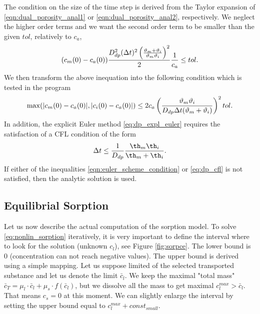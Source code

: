 The condition on the size of the time step is derived from the Taylor expansion of 
\eqref{eqn:dual_porosity_anal1} or \eqref{eqn:dual_porosity_anal2}, respectively. We neglect the higher order 
terms and we want the second order term to be smaller than the given  
$tol$, relatively to $c_a$,
\begin{equation}
  (c_m(0) - c_a(0))
  \frac{ D_{dp}^2 (\Delta t)^2 \left(\frac{\vartheta_m + \vartheta_i}{\vartheta_m \vartheta_i}\right)^2}{2}
  \frac{1}{c_a} \leq tol. \\
\end{equation}
We then transform the above inequation into the following condition which is tested in the program
\begin{equation} \label{eqn:euler_scheme_condition}
  \max(|c_m(0) - c_a(0)|, |c_i(0) - c_a(0)|) \leq 
  2 c_a \left(\frac{\vartheta_m \vartheta_i}{D_{dp} \Delta t (\vartheta_m + \vartheta_i)}\right)^2 tol. \\
\end{equation}
In addition, the explicit Euler method \eqref{eq:dp_expl_euler} requires the satisfaction of a CFL condition of the form
\begin{equation}
\label{eq:dp_cfl}
\Delta t \le \frac1{D_{dp}} \frac{\th_m \th_i}{\th_m+\th_i}.
\end{equation}
If either of the inequalities \eqref{eqn:euler_scheme_condition} or \eqref{eq:dp_cfl} is not satisfied, then the analytic 
solution is used.


\subsection{Equilibrial Sorption}
\label{sec:num_sorp_math}

Let us now describe the actual computation of the sorption model.
To solve \eqref{eq:nonlin_sorption} iteratively, it is very important to define the interval where 
to look for the solution (unknown $c_l$), see Figure \ref{fig:sorpce}. The lower bound is $0$ (concentration can not reach negative values). 
The upper bound is derived using a simple mapping. Let us suppose limited 
 of the selected transported substance and let us denote the 
limit $\bar{c}_l$. We keep the maximal "total mass" 
$\bar{c}_T= \mu_l\cdot \bar{c}_l + \mu_s\cdot f(\bar{c}_l)$, but we dissolve all the mass to get 
maximal $c_l^{max} > \bar{c}_l$. That means $c_s = 0$ at this moment. We can slightly enlarge the interval by setting the upper bound equal to 
$c_l^{max} + const_{small}$.

